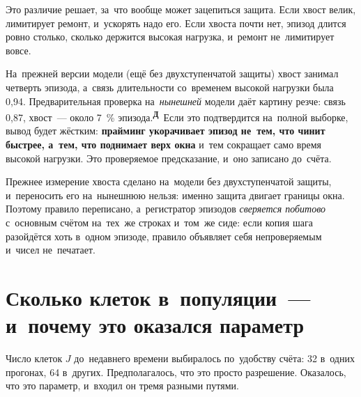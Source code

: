 \documentclass[11pt,a4paper,landscape,twocolumn]{article}
\newcommand{\tD}{\textsuperscript{\sffamily\bfseries\color{cO}Д}}
\begin{document}
Это различие решает, за~что вообще может зацепиться защита. Если хвост велик, лимитирует ремонт, и~ускорять надо его. Если хвоста почти нет, эпизод длится ровно столько, сколько держится высокая нагрузка, и~ремонт не~лимитирует вовсе.

На~прежней версии модели (ещё без двухступенчатой защиты) хвост занимал четверть эпизода, а~связь длительности со~временем высокой нагрузки была 0,94. Предварительная проверка на~\emph{нынешней} модели даёт картину резче: связь 0,87, хвост~— около 7~\% эпизода.\tD\ Если это подтвердится на~полной выборке, вывод будет жёстким: \textbf{прайминг укорачивает эпизод не~тем, что чинит быстрее, а~тем, что поднимает верх окна} и~тем сокращает само время высокой нагрузки. Это проверяемое предсказание, и~оно записано до~счёта.

\begin{note}
Прежнее измерение хвоста сделано на~модели без двухступенчатой защиты, и~переносить его на~нынешнюю нельзя: именно защита двигает границы окна. Поэтому правило переписано, а~регистратор эпизодов \emph{сверяется побитово} с~основным счётом на~тех~же строках и~том~же сиде: если копия шага разойдётся хоть в~одном эпизоде, правило объявляет себя непроверяемым и~чисел не~печатает.
\end{note}

\section{Сколько клеток в~популяции~— и~почему это оказался параметр}\label{sec:J}
Число клеток $J$ до~недавнего времени выбиралось по~удобству счёта: 32 в~одних прогонах, 64 в~других. Предполагалось, что это просто разрешение. Оказалось, что это параметр, и~входил он тремя разными путями.
\end{document}
